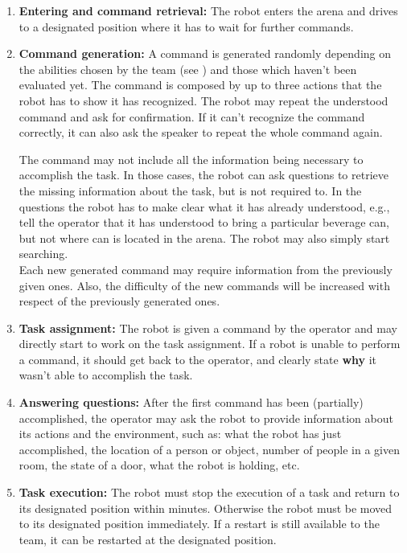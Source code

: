 \begin{enumerate}
	\item \textbf{Entering and command retrieval:} The robot enters the arena and drives to a designated position where it has to wait for further commands. \\

	\item \textbf{Command generation:} A command is generated randomly depending on the abilities chosen by the team (see ) and those which haven't been evaluated yet. The command is composed by up to three actions that the robot has to show it has recognized. The robot may repeat the understood command and ask for confirmation. If it can't recognize the command correctly, it can also ask the speaker to repeat the whole command again.

	The command may not include all the information being necessary to accomplish the task. In those cases, the robot can ask questions to retrieve the missing information about the task, but is not required to. In the questions the robot has to make clear what it has already understood, e.g., tell the operator that it has understood to bring a particular beverage can, but not where can is located in the arena. The robot may also simply start searching. \\

	Each new generated command may require information from the previously given ones. Also, the difficulty of the new commands will be increased with respect of the previously generated ones. \\

	\item \textbf{Task assignment:} The robot is given a command by the operator and may directly start to work on the task assignment. If a robot is unable to perform a command, it should get back to the operator, and clearly state \textbf{why} it wasn't able to accomplish the task. \\

	\item \textbf{Answering questions:} After the first command has been (partially) accomplished, the operator may ask the robot to provide information about its actions and the environment, such as: what the robot has just accomplished, the location of a person or object, number of people in a given room, the state of a door, what the robot is holding, etc. \\

	\item \textbf{Task execution:} The robot must stop the execution of a task and return to its designated position within \eegpsrMaxCmdTime minutes. Otherwise the robot must be moved to its designated position immediately. If a restart is still available to the team, it can be restarted at the designated position. \\


\end{enumerate}
